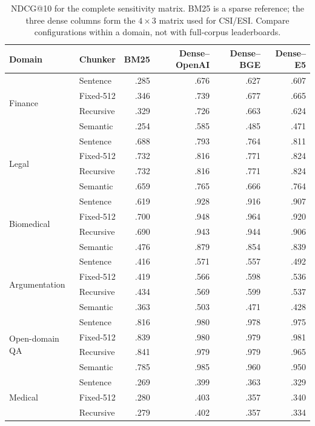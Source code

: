 \documentclass[10pt,letterpaper]{article}
\begin{document}
\begin{table}[t]
\centering
\caption{NDCG@10 for the complete sensitivity matrix. BM25 is a sparse reference; the three dense
columns form the $4\times3$ matrix used for CSI/ESI. Compare configurations within a domain, not
with full-corpus leaderboards.}
\label{tab:matrix}
\scriptsize
\setlength{\tabcolsep}{4.5pt}
\begin{tabular}{llrrrr}
\toprule
Domain & Chunker & BM25 & Dense--OpenAI & Dense--BGE & Dense--E5 \\
\midrule
\multirow{4}{*}{Finance} & Sentence & .285 & .676 & .627 & .607 \\
 & Fixed-512 & .346 & .739 & .677 & .665 \\
 & Recursive & .329 & .726 & .663 & .624 \\
 & Semantic & .254 & .585 & .485 & .471 \\
\midrule
\multirow{4}{*}{Legal} & Sentence & .688 & .793 & .764 & .811 \\
 & Fixed-512 & .732 & .816 & .771 & .824 \\
 & Recursive & .732 & .816 & .771 & .824 \\
 & Semantic & .659 & .765 & .666 & .764 \\
\midrule
\multirow{4}{*}{Biomedical} & Sentence & .619 & .928 & .916 & .907 \\
 & Fixed-512 & .700 & .948 & .964 & .920 \\
 & Recursive & .690 & .943 & .944 & .906 \\
 & Semantic & .476 & .879 & .854 & .839 \\
\midrule
\multirow{4}{*}{Argumentation} & Sentence & .416 & .571 & .557 & .492 \\
 & Fixed-512 & .419 & .566 & .598 & .536 \\
 & Recursive & .434 & .569 & .599 & .537 \\
 & Semantic & .363 & .503 & .471 & .428 \\
\midrule
\multirow{4}{*}{Open-domain QA} & Sentence & .816 & .980 & .978 & .975 \\
 & Fixed-512 & .839 & .980 & .979 & .981 \\
 & Recursive & .841 & .979 & .979 & .965 \\
 & Semantic & .785 & .985 & .960 & .950 \\
\midrule
\multirow{4}{*}{Medical} & Sentence & .269 & .399 & .363 & .329 \\
 & Fixed-512 & .280 & .403 & .357 & .340 \\
 & Recursive & .279 & .402 & .357 & .334 \\

\end{tabular}
\end{table}
\end{document}
